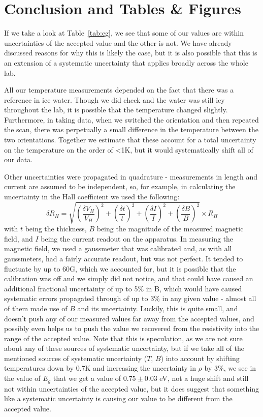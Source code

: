 \documentclass[reprint, nobibnotes, amssymb, amsmath, amsfonts, physics, mathtools, mathrsfs, floatfix]{revtex4-1}
\begin{document}
    \section{Conclusion and Tables \& Figures}
    If we take a look at Table~\ref{tab:eg}, we see that some of our values are within uncertainties of the accepted value and the other is not.  We have already discussed reasons for why this is likely the case, but it is also possible that this is an extension of a systematic uncertainty that applies broadly across the whole lab.

    All our temperature measurements depended on the fact that there was a reference in ice water.  Though we did check and the water was still icy throughout the lab, it is possible that the temperature changed slightly.  Furthermore, in taking data, when we switched the orientation and then repeated the scan, there was perpetually a small difference in the temperature between the two orientations.  Together we estimate that these account for a total uncertainty on the temperature on the order of <1K, but it would systematically shift all of our data.

    Other uncertainties were propagated in quadrature - measurements in length and current are assumed to be independent, so, for example, in calculating the uncertainty in the Hall coefficient we used the following:
    \begin{equation}
      \delta R_H = \sqrt{ \left(\frac{\delta V_H}{V_H}\right)^2 + \left(\frac{\delta t}{t}\right)^2 + \left(\frac{\delta I}{I}\right)^2 + \left(\frac{\delta B}{B}\right)^2 } \times R_H
    \end{equation}
    with $t$ being the thickness, $B$ being the magnitude of the measured magnetic field, and $I$ being the current readout on the apparatus.  In measuring the magnetic field, we used a gaussmeter that was calibrated and, as with all gaussmeters, had a fairly accurate readout, but was not perfect.  It tended to fluctuate by up to 60G, which we accounted for, but it is possible that the calibration was off and we simply did not notice, and that could have caused an additional fractional uncertainty of up to 5\% in B, which would have caused systematic errors propagated through of up to 3\% in any given value - almost all of them made use of $B$ and its uncertainty.  Luckily, this is quite small, and doesn't push any of our measured values far away from the accepted values, and possibly even helps us to push the value we recovered from the resistivity into the range of the accepted value.  Note that this is speculation, as we are not sure about any of these sources of systematic uncertainty, but if we take all of the mentioned sources of systematic uncertainty ($T$, $B$) into account by shifting temperatures down by 0.7K and increasing the uncertainty in $\rho$ by 3\%, we see in the value of $E_g$ that we get a value of $0.75\pm0.03$ eV, not a huge shift and still not within uncertainties of the accepted value, but it does suggest that something like a systematic uncertainty is causing our value to be different from the accepted value.
\end{document}

